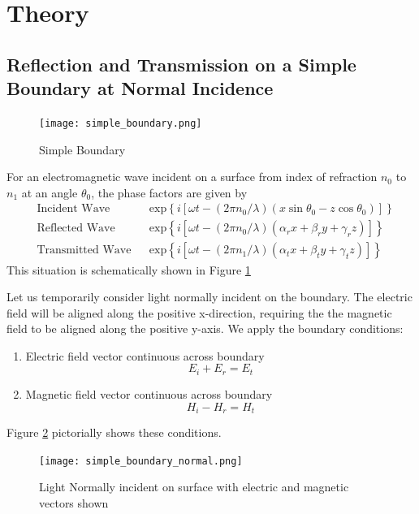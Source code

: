 \documentclass{article}
\begin{document}
\section{Theory}
\subsection{Reflection and Transmission on a Simple Boundary at Normal Incidence}
    \begin{figure}
        \texttt{[image: simple\_boundary.png]}
        \caption{Simple Boundary}
        \label{fig:simp}
    \end{figure}
    For an electromagnetic wave incident on a surface from index of refraction $n_0$ to $n_1$ at an angle $\theta_0$, the phase factors are given by
    \begin{align}
        &\text{Incident Wave} & &\mathrm{exp}\left\{ i [\omega t - (2\pi n_0 / \lambda)(x \sin \theta_0 - z \cos \theta_0)]\right\} \\
        &\text{Reflected Wave} & &\mathrm{exp}\left\{ i [\omega t - (2\pi n_0 / \lambda)(\alpha_r x + \beta_r y + \gamma_r z)]\right\} \\
        &\text{Transmitted Wave} & &\mathrm{exp}\left\{ i [\omega t - (2\pi n_1 / \lambda)(\alpha_t x + \beta_t y + \gamma_t z)]\right\}
    \end{align}
    This situation is schematically shown in Figure \ref{fig:simp}

    Let us temporarily consider light normally incident on the boundary. The electric field will be aligned along the positive x-direction, requiring the the magnetic field to be aligned along the positive y-axis. We apply the boundary conditions:
    \begin{enumerate}
        \item Electric field vector continuous across boundary
        \begin{equation}
            E_i + E_r = E_t
        \end{equation} 
        \item Magnetic field vector continuous across boundary
        \begin{equation}
            H_i - H_r = H_t
            \label{eq:magcont}
        \end{equation}
    \end{enumerate}
    Figure \ref{fig:norm} pictorially shows these conditions.

    \begin{figure}
        \texttt{[image: simple\_boundary\_normal.png]}
        \caption{Light Normally incident on surface with electric and magnetic vectors shown}
        \label{fig:norm}
    \end{figure}
\end{document}
